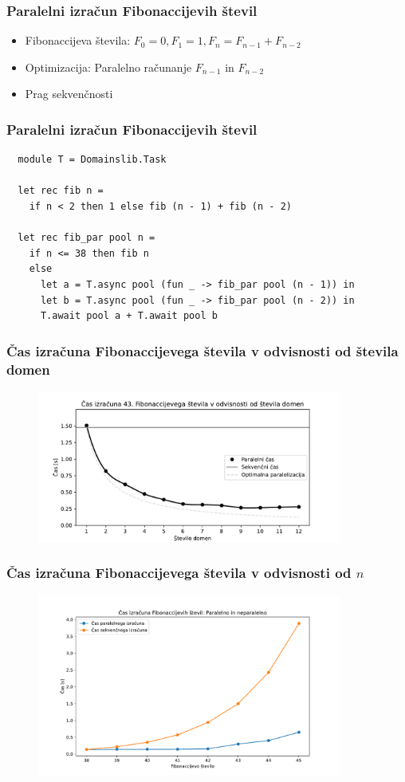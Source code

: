 \documentclass{beamer}
\begin{document}
\begin{frame}[fragile]
  \frametitle{Paralelni izračun Fibonaccijevih števil}
  \begin{itemize}
    \item Fibonaccijeva števila: $F_0 = 0, F_1 = 1, F_n = F_{n-1} + F_{n-2}$
    \item Optimizacija: Paralelno računanje $F_{n-1}$ in $F_{n-2}$
    \item Prag sekvenčnosti
  \end{itemize}
\end{frame}

\begin{frame}[fragile]
  \frametitle{Paralelni izračun Fibonaccijevih števil}
  \begin{verbatim}
  module T = Domainslib.Task

  let rec fib n = 
    if n < 2 then 1 else fib (n - 1) + fib (n - 2)
  
  let rec fib_par pool n =
    if n <= 38 then fib n
    else
      let a = T.async pool (fun _ -> fib_par pool (n - 1)) in
      let b = T.async pool (fun _ -> fib_par pool (n - 2)) in
      T.await pool a + T.await pool b
  \end{verbatim}
\end{frame}

\begin{frame}
  \frametitle{Čas izračuna Fibonaccijevega števila v odvisnosti od števila domen}
  \begin{figure}[h!]
    \centering
    \includegraphics[width=10cm]{slike/fib_par_v_odvisnosti_od_domen.pdf}
  \end{figure}
\end{frame}

\begin{frame}
  \frametitle{Čas izračuna Fibonaccijevega števila v odvisnosti od $n$}
  \begin{figure}[h!]
    \centering
    \includegraphics[width=10cm]{slike/fib_par_v_odvisnosti_od_n.pdf}
  \end{figure}
\end{frame}
\end{document}
